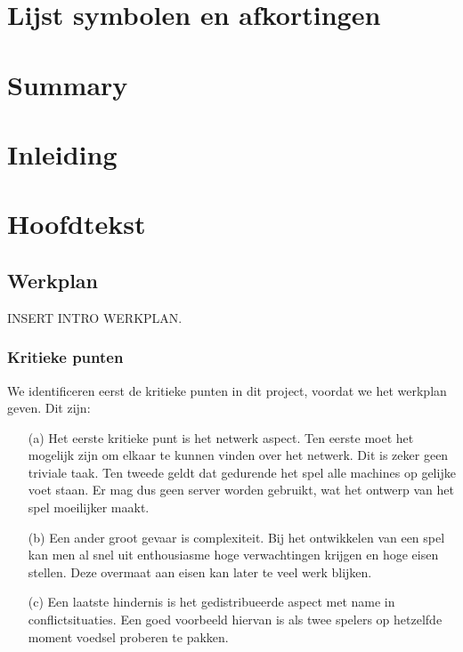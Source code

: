\documentclass[a4paper,11pt, twoside]{article}
\begin{document}
	

	\tableofcontents
	\newpage

	\section{Lijst symbolen en afkortingen}

    \section{Summary}

    \section{Inleiding}
    

    \section{Hoofdtekst}

    \subsection{Werkplan}
    INSERT INTRO WERKPLAN.
    
    \subsubsection{Kritieke punten}
    We identificeren eerst de kritieke punten in dit project, voordat we het werkplan geven. Dit zijn:
    \begin{enumerate}
    \item[(a)] Het eerste kritieke punt is het netwerk aspect. Ten eerste moet het mogelijk zijn om elkaar te kunnen vinden over het netwerk. Dit is zeker geen triviale taak. Ten tweede geldt dat gedurende het spel alle machines op gelijke voet staan. Er mag dus geen server worden gebruikt, wat het ontwerp van het spel moeilijker maakt.
    \item[(b)] Een ander groot gevaar is complexiteit. Bij het ontwikkelen van een spel kan men al snel uit enthousiasme hoge verwachtingen krijgen en hoge eisen stellen. Deze overmaat aan eisen kan later te veel werk blijken.
    \item[(c)] Een laatste hindernis is het gedistribueerde aspect met name in conflictsituaties. Een goed voorbeeld hiervan is als twee spelers op hetzelfde moment voedsel proberen te pakken. 
    \end{enumerate}
    
\end{document}
